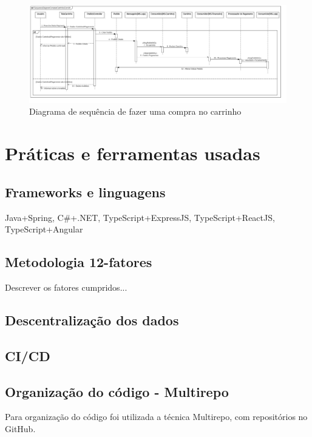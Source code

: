 \begin{figure}[htb]
	\caption{\label{figura-diagrama-de-sequencia}Diagrama de sequência de fazer uma compra no carrinho}
	\begin{center}
	    \includegraphics[scale=0.16]{Diagramas/imagens/SequenceComprarCarrinhoComFinanceiroComAlt.jpg}
	\end{center}
\end{figure}


\section{Práticas e ferramentas usadas}
\subsection*{Frameworks e linguagens}
Java+Spring, C\#+.NET, TypeScript+ExpressJS, TypeScript+ReactJS, TypeScript+Angular

\subsection*{Metodologia 12-fatores}
Descrever os fatores cumpridos...

\subsection*{Descentralização dos dados}

\subsection*{CI/CD}


\subsection*{Organização do código - Multirepo}
Para organização do código foi utilizada a técnica Multirepo, com repositórios no GitHub.

